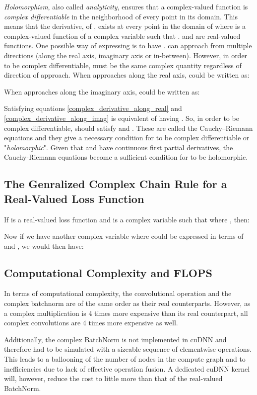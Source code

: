 \documentclass{article}
\begin{document}
\textit{Holomorphism}, also called \textit{analyticity}, ensures that a complex-valued function is \textit{complex differentiable} in the neighborhood of every point in its domain. This means that the derivative,  of , exists at every point  in the domain of  where  is a complex-valued function of a complex variable  such that .  and  are real-valued functions. One possible way of expressing  is to have .  can approach  from multiple directions (along the real axis, imaginary axis or in-between). However, in order to be complex differentiable,  must be the same complex quantity regardless of direction of approach. When  approaches  along the real axis,  could be written as:

When  approaches  along the imaginary axis,  could be written as:


Satisfying equations \ref{complex_derivative_along_real} and \ref{complex_derivative_along_imag} is equivalent of having . So, in order to be complex differentiable,  should satisfy  and . These are called the Cauchy–Riemann equations and they give a necessary condition for  to be complex differentiable or "\textit{holomorphic}". Given that  and  have continuous first partial derivatives, the Cauchy-Riemann equations become a sufficient condition for  to be holomorphic.

\subsection{The Genralized Complex Chain Rule for a Real-Valued Loss Function}\label{chainrule}
If  is a real-valued loss function and  is a complex variable such that  where , then:

Now if we have another complex variable  where  could be expressed in terms of  and , we would then have:


\subsection{Computational Complexity and FLOPS}\label{CCFLOPS}
In terms of computational complexity, the convolutional operation and the complex batchnorm are of the same order as their real counterparts. However, as a complex multiplication is 4 times more expensive than its real counterpart, all complex convolutions are 4 times more expensive as well.

Additionally, the complex BatchNorm is not implemented in cuDNN and therefore had to be simulated with a sizeable sequence of elementwise operations. This leads to a ballooning of the number of nodes in the compute graph and to inefficiencies due to lack of effective operation fusion. A dedicated cuDNN kernel will, however, reduce the cost to little more than that of the real-valued BatchNorm.
\end{document}
